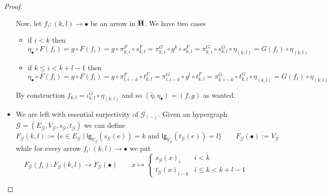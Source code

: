 \documentclass[3p]{elsarticle}
\newcommand{\lgh}{\mathsf{lg}}
\newcommand{\catname}[1]{\textbf{\textup{#1}}}
\theoremstyle{remark}
\theoremstyle{definition}
\begin{document}
\begin{proof}
\begin{itemize}
		 Now, let $f_i\colon (k,l)\to \bullet$ be an arrow in $\catname{H}$. We have two cases
		 \begin{itemize}
		 	\item if $i<k$ then 
		 	\[\eta_{\bullet}\circ F(f_i) = g\circ F(f_i) = g\circ \pi^F_{k, i}\circ s^F_{k,l}= \pi^G_{k,i}\circ g^k\circ s^F_{k,l} = \pi^G_{k,i} \circ s^G_{k,l}\circ \eta_{(k,l)} = G(f_i)\circ \eta_{(k,l)}  \]
		 	\item if $k\leq i < k+l-1$ then
		 	\[\eta_{\bullet} \circ F(f_i) = g\circ F(f_i) = g\circ \pi^F_{l, i-k} \circ t^{F}_{k,l} = \pi^G_{l, i-k}\circ g^l \circ t^F_{k,l}= \pi^G_{k, i-k}\circ t^G_{k,l}\circ \eta_{(k,l)} = G(f_i)\circ \eta_{(k,l)}\]
		 \end{itemize}
		 
	By construction $f_{k,l}= \iota^G_{k,l} \circ \eta_{(k,l)}$ and so $(\hat{\eta}, \eta_{\bullet})=(f,g)$ as wanted. 
	
		\item We are left with essential surjectivity of $\mathcal{G}_{(-)}$. Given an hypergraph $\mathcal{G}=(E_\mathcal{G}, V_\mathcal{G}, s_\mathcal{G}, t_\mathcal{G})$ we can define 
		\[	F_{\mathcal{G}}(k,l):=\{e\in E_{\mathcal{G}} \mid \lgh_{V_{\mathcal{G}}}(s_{{\mathcal{G}}}(e)) = k \text{ and } \lgh_{V_{\mathcal{G}}}(t_{{\mathcal{G}}}(e)) = l \} \qquad F_{\mathcal{G}}(\bullet):=V_\mathcal{G}\]
		while for every arrow $f_i\colon (k,l)\to \bullet$ we put
		\[F_{\mathcal{G}}(f_i)\colon F_{\mathcal{G}}(k,l)\to F_{\mathcal{G}}(\bullet) \qquad x\mapsto \begin{cases}
			s_\mathcal{G}(x)_i& i<k\\
			t_\mathcal{G}(x)_{i-k} &i\leq k < k+l-1
		\end{cases}  \]
		 

\end{itemize}
\end{proof}
\end{document}
